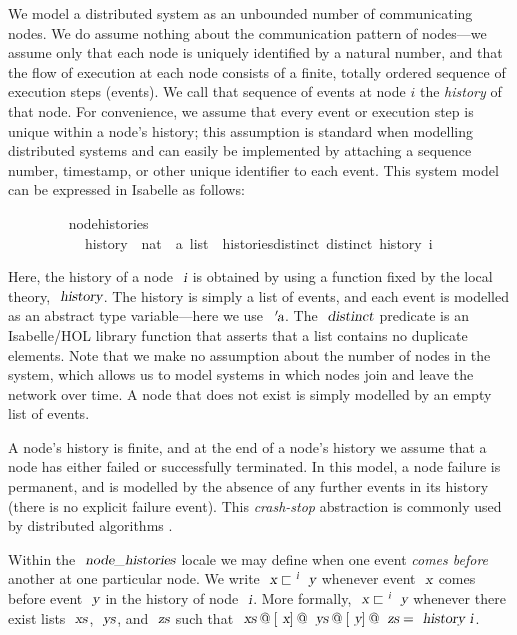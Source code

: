 We model a distributed system as an unbounded number of communicating nodes.
We do assume nothing about the communication pattern of nodes---we assume only that each node is uniquely identified by a natural number, and that the flow of execution at each node consists of a finite, totally ordered sequence of execution steps (events).
We call that sequence of events at node $i$ the \emph{history} of that node.
For convenience, we assume that every event or execution step is unique within a node's history; this assumption is standard when modelling distributed systems \cite{Cachin:2011wt} and can easily be implemented by attaching a sequence number, timestamp, or other unique identifier to each event.
This system model can be expressed in Isabelle as follows:
\vspace{0.35em}
\begin{isabellebody}
\ \ \ \ \ \ \ \  node{\isacharunderscore}histories\ {\isacharequal}\ \isanewline
\ \ \ \ \ \ \ \ \ \ \ history\ {\isacharcolon}{\isacharcolon}\ {\isachardoublequoteopen}nat\ {\isasymRightarrow}\ {\isacharprime}a\ list{\isachardoublequoteclose}\ \ histories{\isacharunderscore}distinct{\isacharcolon}\ {\isachardoublequoteopen}distinct\ {\isacharparenleft}history\ i{\isacharparenright}{\isachardoublequoteclose}
\end{isabellebody}
\vspace{0.35em}
Here, the history of a node $\isa{i}$ is obtained by using a function fixed by the local theory, $\isa{history}$.
The history is simply a list of events, and each event is modelled as an abstract type variable---here we use $\isa{{\isacharprime}a}$.
The $\isa{distinct}$ predicate is an Isabelle/HOL library function that asserts that a list contains no duplicate elements.
Note that we make no assumption about the number of nodes in the system, which allows us to model systems in which nodes join and leave the network over time.
A node that does not exist is simply modelled by an empty list of events.

A node's history is finite, and at the end of a node's history we assume that a node has either failed or successfully terminated.
In this model, a node failure is permanent, and is modelled by the absence of any further events in its history (there is no explicit failure event).
This \emph{crash-stop} abstraction is commonly used by distributed algorithms \cite{Cachin:2011wt}.

Within the $\isa{node{\isacharunderscore}histories}$ locale we may define when one event \emph{comes before} another at one particular node.
We write $\isa{x} \sqsubset^\isa{i} \isa{y}$ whenever event $\isa{x}$ comes before event $\isa{y}$ in the history of node $\isa{i}$.
More formally, $\isa{x} \sqsubset^\isa{i} \isa{y}$ whenever there exist lists $\isa{xs}$, $\isa{ys}$, and $\isa{zs}$ such that $\isa{xs}\mathbin{@}[\isa{x}]\mathbin{@}\isa{ys}\mathbin{@}[\isa{y}]\mathbin{@}\isa{zs} = \isa{history\ i}$.

